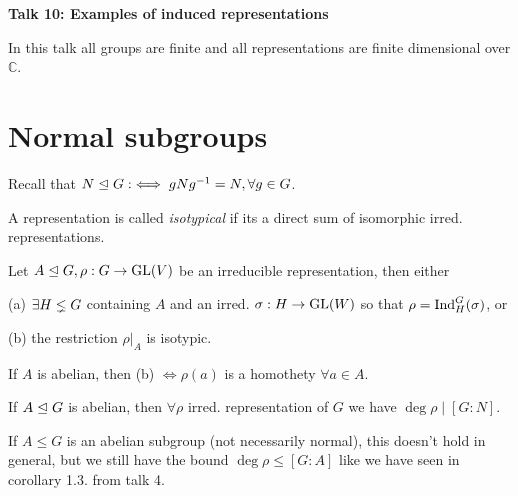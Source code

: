 \documentclass{article}
\begin{document}
\pagestyle{fancy}
\renewcommand{\footrulewidth}{0.4pt}
\fancyhead{}
\fancyfoot{}
    \begin{center}
    	\Huge{\textbf{Talk 10: Examples of induced representations}}%
      \end{center}

      \begin{multicols*}{2}
        \begin{rem*}
            In this talk all groups are finite and all representations are finite dimensional over $\mathbb C$.
        \end{rem*}
        \section{Normal subgroups}
        \begin{defi}[Normal subgroup]
          Recall that $N \trianglelefteq G :\iff gNg^{-1} = N, \forall g \in G$.
        \end{defi}
        \begin{defi}
          A representation is called \emph{isotypical} if its a direct sum of isomorphic irred. representations.
        \end{defi}
        \begin{prop}
          Let $A \trianglelefteq G, \rho: G \to \operatorname{GL}(V)$ be an irreducible representation, then either
          \item (a) $\exists H \lneq G$ containing $A$ and an irred. $\sigma : H \to \operatorname{GL}(W)$ so that $\rho = \operatorname{Ind}_{H}^{G}(\sigma)$, or
          \item (b) the restriction $\rho|_{A}$ is isotypic.
        \end{prop}

\begin{rem}
If $A$ is abelian, then (b) $\iff \rho(a)$ is a homothety $\forall a \in A$.
\end{rem}
        \begin{cor}
If $A \trianglelefteq G$ is abelian, then $\forall \rho$ irred. representation of $G$ we have $\deg \rho \mid [G:N]$.
\end{cor}

\begin{rem}
  If $A \le G$ is an abelian subgroup (not necessarily normal), this doesn't hold in general, but we still have the bound $\deg \rho \le [G: A]$ like we have seen in corollary 1.3. from talk 4.
\end{rem}


\end{multicols*}
\end{document}
